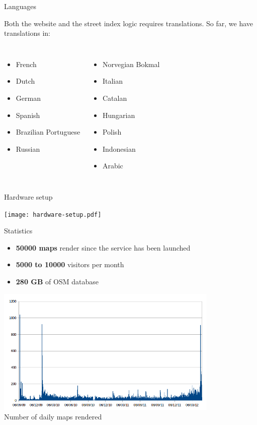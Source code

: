 \documentclass{beamer}
\begin{document}
\begin{frame}{Languages}

  Both the website and the street index logic requires
  translations. So far, we have translations in:
  \begin{columns}
    \begin{itemize}
    \item French
    \item Dutch
    \item German
    \item Spanish
    \item Brazilian Portuguese
    \item Russian
    \end{itemize}
    \begin{itemize}
    \item Norvegian Bokmal
    \item Italian
    \item Catalan
    \item Hungarian
    \item Polish
    \item Indonesian
    \item Arabic
    \end{itemize}
  \end{columns}
\end{frame}

\begin{frame}{Hardware setup}
  \begin{center}
    \texttt{[image: hardware-setup.pdf]}
  \end{center}
\end{frame}

\begin{frame}{Statistics}
  \begin{itemize}
    \item {\bf 50000 maps} render since the service has been launched
    \item {\bf 5000 to 10000} visitors per month
    \item {\bf 280 GB} of OSM database
  \end{itemize}
  \begin{center}
    \includegraphics[width=0.8\textwidth]{maposmatic-stats.png}\\
    Number of daily maps rendered
  \end{center}
\end{frame}
\end{document}
